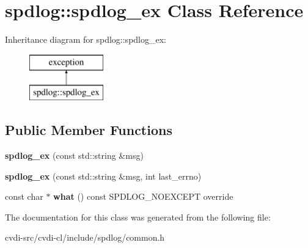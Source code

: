 \hypertarget{classspdlog_1_1spdlog__ex}{}\section{spdlog\+:\+:spdlog\+\_\+ex Class Reference}
\label{classspdlog_1_1spdlog__ex}
Inheritance diagram for spdlog\+:\+:spdlog\+\_\+ex\+:\begin{figure}[H]
\begin{center}
\leavevmode
\includegraphics[height=2.000000cm]{classspdlog_1_1spdlog__ex}
\end{center}
\end{figure}
\subsection*{Public Member Functions}
\begin{DoxyCompactItemize}
\item 
{\bfseries spdlog\+\_\+ex} (const std\+::string \&msg)\hypertarget{classspdlog_1_1spdlog__ex_a278ea1931ba954109480a619ef5ac945}{}\label{classspdlog_1_1spdlog__ex_a278ea1931ba954109480a619ef5ac945}

\item 
{\bfseries spdlog\+\_\+ex} (const std\+::string \&msg, int last\+\_\+errno)\hypertarget{classspdlog_1_1spdlog__ex_a0758933dd1e6c4c8e76bb8e7134f7d9b}{}\label{classspdlog_1_1spdlog__ex_a0758933dd1e6c4c8e76bb8e7134f7d9b}

\item 
const char $\ast$ {\bfseries what} () const S\+P\+D\+L\+O\+G\+\_\+\+N\+O\+E\+X\+C\+E\+PT override\hypertarget{classspdlog_1_1spdlog__ex_a9a9b9a7981e472cad06d453e368b6195}{}\label{classspdlog_1_1spdlog__ex_a9a9b9a7981e472cad06d453e368b6195}

\end{DoxyCompactItemize}


The documentation for this class was generated from the following file\+:\begin{DoxyCompactItemize}
\item 
cvdi-\/src/cvdi-\/cl/include/spdlog/common.\+h\end{DoxyCompactItemize}
